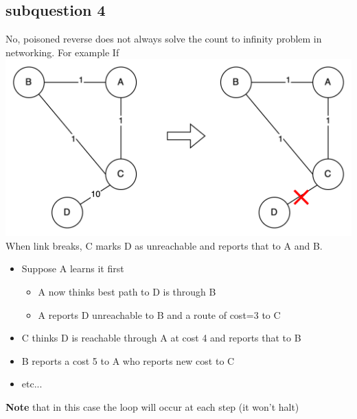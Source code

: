\documentclass{article}
\begin{document}
\subsection{subquestion 4}
No, poisoned reverse does not always solve the count to infinity problem in networking. For example If\\
\includegraphics[width=1\textwidth]{image.png} 
\newline
When link breaks, C marks D as unreachable and reports that to A and B.
\begin{itemize}
    \item Suppose A learns it first
    \begin{itemize}
        \item A now thinks best path to D is through B
        \item A reports D unreachable to B and a route of cost=3 to C
    \end{itemize}
    \item C thinks D is reachable through A at cost 4 and reports that to B
    \item B reports a cost 5 to A who reports new cost to C
    \item etc...
\end{itemize}
\textbf{Note} that in this case the loop will occur at each step (it won’t halt)
\end{document}
